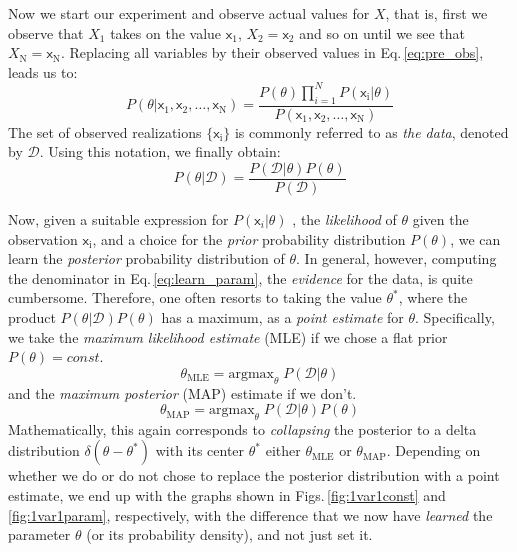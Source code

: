 \documentclass[]{report}
\begin{document}
Now we start our experiment and observe actual values for $X$, that is, first we observe that $X_1$ takes on the value $\mathsf{x}_1$, $X_2=\mathsf{x}_2$ and so on until we see that $X_\mathrm{N} = \mathsf{x}_\mathrm{N}$. Replacing all variables by their observed values in Eq.\,\ref{eq:pre_obs}, leads us to: 
\begin{equation} \label{eq:post_obs}
P( \theta | \mathsf{x}_1, \mathsf{x}_2, \ldots, \mathsf{x}_\mathrm{N} )
=
\frac
	{
		P( \theta )
		\prod_{i=1}^{N}
			P( \mathsf{x}_\mathrm{i} | \theta )
	}
	{
		P( \mathsf{x}_1, \mathsf{x}_2, \ldots, \mathsf{x}_\mathrm{N} )
	}
\end{equation}
The set of observed realizations $ \{ \mathsf{x}_\mathrm{i} \} $ is commonly referred to as \emph{the data}, denoted by $\mathcal{D}$. Using this notation, we finally obtain:
\begin{equation} \label{eq:learn_param}
P( \theta | \mathcal{D} )
=
\frac
	{
		P( \mathcal{D} | \theta )
		P( \theta )
	}
	{
		P( \mathcal{D} )
	}
\end{equation}

Now, given a suitable expression for $P( \mathsf{x}_i | \theta ) $ , the \emph{likelihood} of $\theta$ given the observation $\mathsf{x}_\mathrm{i}$, and a choice for the \emph{prior} probability distribution $P(\theta)$, we can learn the \emph{posterior} probability distribution of $\theta$. In general, however, computing the denominator in Eq.\,\ref{eq:learn_param}, the \emph{evidence} for the data, is quite cumbersome. Therefore, one often resorts to taking the value $\theta^*$, where the product $P( \theta | \mathcal{D} ) P( \theta ) $ has a maximum, as a \emph{point estimate} for $\theta$. Specifically, we take the \emph{maximum likelihood estimate} (MLE) if we chose a flat prior $P(\theta) = const.$
\begin{equation}
\theta_\mathrm{MLE}
=
\mathrm{argmax}_\theta\;
	P( \mathcal{D} | \theta )
\end{equation}
and the \emph{maximum posterior} (MAP) estimate if we don't.
\begin{equation}
\theta_\mathrm{MAP}
=
\mathrm{argmax}_\theta\;
	P( \mathcal{D} | \theta )
	P( \theta )
\end{equation}
Mathematically, this again corresponds to \emph{collapsing} the posterior to a delta distribution $\delta( \theta - \theta^* )$ with its center $\theta^*$ either $\theta_\mathrm{MLE}$ or $\theta_\mathrm{MAP}$. Depending on whether we do or do not chose to replace the posterior distribution with a point estimate, we end up with the graphs shown in Figs.\,\ref{fig:1var1const} and \ref{fig:1var1param}, respectively, with the difference that we now have \emph{learned} the parameter $\theta$ (or its probability density), and not just set it.
\end{document}
